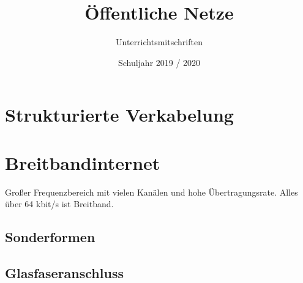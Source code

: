 \documentclass{scrartcl}
\title{Öffentliche Netze}
\subtitle{Unterrichtsmitschriften}
\date{Schuljahr 2019 / 2020}
\begin{document}
\maketitle
\tableofcontents

\section{Strukturierte Verkabelung}

\section{Breitbandinternet}

Großer Frequenzbereich mit vielen Kanälen und hohe Übertragungsrate. Alles über 64 kbit/s ist Breitband.

\subsection{Sonderformen}
\subsection{Glasfaseranschluss}
\end{document}
